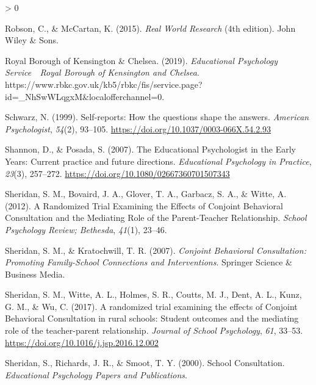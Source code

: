 \documentclass[
  english,
  man]{apa7}
\newlength{\cslhangindent}
\newenvironment{CSLReferences}[2] %
 {%
  \setlength{\parindent}{0pt}
  \ifodd #1 \everypar{\setlength{\hangindent}{\cslhangindent}}\ignorespaces\fi
  \ifnum #2 > 0
  \setlength{\parskip}{#2\baselineskip}
  \fi
 }%
 {}
\begin{document}
\begin{CSLReferences}{1}{0}
\leavevmode\hypertarget{ref-robsonRealWorldResearch2015}{}%
Robson, C., \& McCartan, K. (2015). \emph{Real {World Research}} (4th edition). {John Wiley \& Sons}.

\leavevmode\hypertarget{ref-royalboroughofkensingtonchelseaEducationalPsychologyService2019}{}%
Royal Borough of Kensington \& Chelsea. (2019). \emph{Educational {Psychology Service}~\textbar~{Royal Borough} of {Kensington} and {Chelsea}}. https://www.rbkc.gov.uk/kb5/rbkc/fis/service.page?id=\_NhSwWLqgxM\&localofferchannel=0.

\leavevmode\hypertarget{ref-schwarzSelfreportsHowQuestions1999}{}%
Schwarz, N. (1999). Self-reports: {How} the questions shape the answers. \emph{American Psychologist}, \emph{54}(2), 93--105. \url{https://doi.org/10.1037/0003-066X.54.2.93}

\leavevmode\hypertarget{ref-shannonEducationalPsychologistEarly2007}{}%
Shannon, D., \& Posada, S. (2007). The {Educational Psychologist} in the {Early Years}: {Current} practice and future directions. \emph{Educational Psychology in Practice}, \emph{23}(3), 257--272. \url{https://doi.org/10.1080/02667360701507343}

\leavevmode\hypertarget{ref-sheridanRandomizedTrialExamining2012}{}%
Sheridan, S. M., Bovaird, J. A., Glover, T. A., Garbacz, S. A., \& Witte, A. (2012). A {Randomized Trial Examining} the {Effects} of {Conjoint Behavioral Consultation} and the {Mediating Role} of the {Parent}-{Teacher Relationship}. \emph{School Psychology Review; Bethesda}, \emph{41}(1), 23--46.

\leavevmode\hypertarget{ref-sheridanConjointBehavioralConsultation2007}{}%
Sheridan, S. M., \& Kratochwill, T. R. (2007). \emph{Conjoint {Behavioral Consultation}: {Promoting Family}-{School Connections} and {Interventions}}. {Springer Science \& Business Media}.

\leavevmode\hypertarget{ref-sheridanRandomizedTrialExamining2017}{}%
Sheridan, S. M., Witte, A. L., Holmes, S. R., Coutts, M. J., Dent, A. L., Kunz, G. M., \& Wu, C. (2017). A randomized trial examining the effects of {Conjoint Behavioral Consultation} in rural schools: {Student} outcomes and the mediating role of the teacher-parent relationship. \emph{Journal of School Psychology}, \emph{61}, 33--53. \url{https://doi.org/10.1016/j.jsp.2016.12.002}

\leavevmode\hypertarget{ref-sheridanSchoolConsultation2000}{}%
Sheridan, S., Richards, J. R., \& Smoot, T. Y. (2000). School {Consultation}. \emph{Educational Psychology Papers and Publications}.


\end{CSLReferences}
\end{document}
